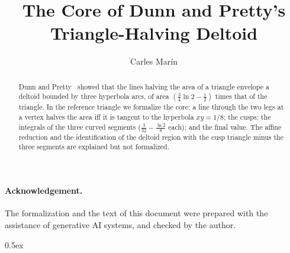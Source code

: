\documentclass[10pt,a4paper]{article}
\begin{document}
\title{The Core of Dunn and Pretty's Triangle-Halving Deltoid}
\author{Carles Mar\'in}
\maketitle

\begin{abstract}
Dunn and Pretty~\cite{DunnPretty1972} showed that the lines halving the area of a triangle envelope a
deltoid bounded by three hyperbola arcs, of area $(\frac34\ln 2-\frac12)$ times that of the triangle. In the reference
triangle we formalize the core: a line through the two legs at a vertex halves the area iff it is tangent to the
hyperbola $xy=1/8$; the cusps; the integrals of the three curved segments ($\frac{3}{32}-\frac{\ln 2}{8}$ each); and
the final value. The affine reduction and the identification of the deltoid region with the cusp triangle minus the
three segments are explained but not formalized.
\end{abstract}

\paragraph{Acknowledgement.} The formalization and the text of this document were prepared with the
assistance of generative AI systems, and checked by the author.

\tableofcontents

\parindent 0pt\parskip 0.5ex





\end{document}
